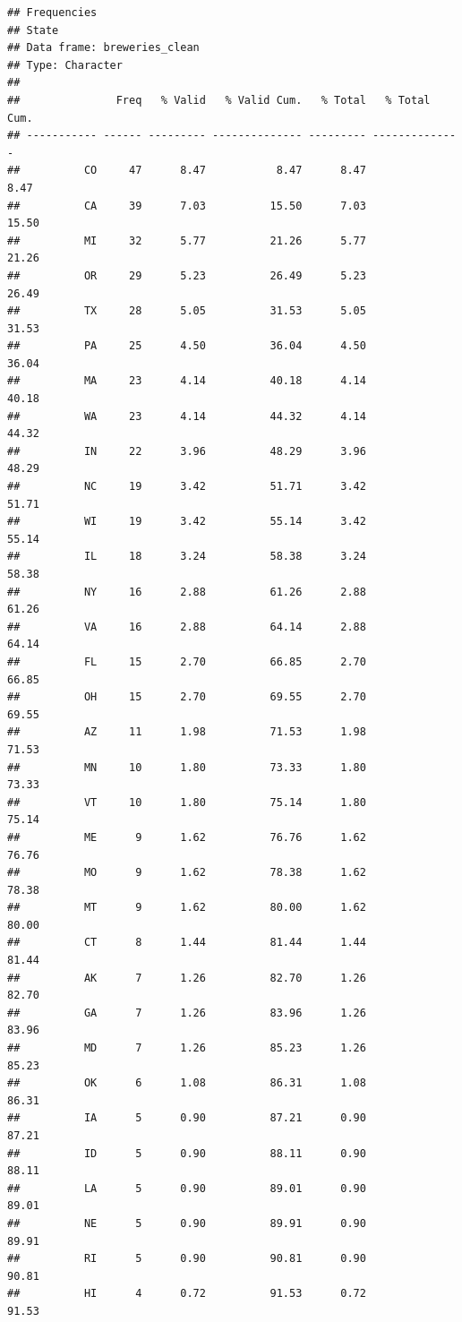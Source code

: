 \documentclass[]{article}
\begin{document}
\begin{verbatim}
## Frequencies   
## State     
## Data frame: breweries_clean   
## Type: Character   
## 
##               Freq   % Valid   % Valid Cum.   % Total   % Total Cum.
## ----------- ------ --------- -------------- --------- --------------
##          CO     47      8.47           8.47      8.47           8.47
##          CA     39      7.03          15.50      7.03          15.50
##          MI     32      5.77          21.26      5.77          21.26
##          OR     29      5.23          26.49      5.23          26.49
##          TX     28      5.05          31.53      5.05          31.53
##          PA     25      4.50          36.04      4.50          36.04
##          MA     23      4.14          40.18      4.14          40.18
##          WA     23      4.14          44.32      4.14          44.32
##          IN     22      3.96          48.29      3.96          48.29
##          NC     19      3.42          51.71      3.42          51.71
##          WI     19      3.42          55.14      3.42          55.14
##          IL     18      3.24          58.38      3.24          58.38
##          NY     16      2.88          61.26      2.88          61.26
##          VA     16      2.88          64.14      2.88          64.14
##          FL     15      2.70          66.85      2.70          66.85
##          OH     15      2.70          69.55      2.70          69.55
##          AZ     11      1.98          71.53      1.98          71.53
##          MN     10      1.80          73.33      1.80          73.33
##          VT     10      1.80          75.14      1.80          75.14
##          ME      9      1.62          76.76      1.62          76.76
##          MO      9      1.62          78.38      1.62          78.38
##          MT      9      1.62          80.00      1.62          80.00
##          CT      8      1.44          81.44      1.44          81.44
##          AK      7      1.26          82.70      1.26          82.70
##          GA      7      1.26          83.96      1.26          83.96
##          MD      7      1.26          85.23      1.26          85.23
##          OK      6      1.08          86.31      1.08          86.31
##          IA      5      0.90          87.21      0.90          87.21
##          ID      5      0.90          88.11      0.90          88.11
##          LA      5      0.90          89.01      0.90          89.01
##          NE      5      0.90          89.91      0.90          89.91
##          RI      5      0.90          90.81      0.90          90.81
##          HI      4      0.72          91.53      0.72          91.53

\end{verbatim}
\end{document}
